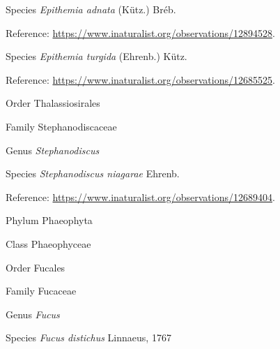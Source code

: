 \documentclass[9pt, article]{memoir}
\begin{document}
\begin{multicols}{2}
\vspace{6pt}\noindent\hspace{36pt}Species \textit{Epithemia adnata} (Kütz.) Bréb.


\vspace{6pt}Reference: 
\url{https://www.inaturalist.org/observations/12894528}.

\vspace{6pt}\noindent\hspace{36pt}Species \textit{Epithemia turgida} (Ehrenb.) Kütz.


\vspace{6pt}Reference: 
\url{https://www.inaturalist.org/observations/12685525}.

\vspace{6pt}\noindent\hspace{18pt}Order Thalassiosirales


\vspace{6pt}\noindent\hspace{24pt}Family Stephanodiscaceae


\vspace{6pt}\noindent\hspace{30pt}Genus \textit{Stephanodiscus}


\vspace{6pt}\noindent\hspace{36pt}Species \textit{Stephanodiscus niagarae} Ehrenb.


\vspace{6pt}Reference: 
\url{https://www.inaturalist.org/observations/12689404}.

\vspace{6pt}\noindent\hspace{6pt}Phylum Phaeophyta


\vspace{6pt}\noindent\hspace{12pt}Class Phaeophyceae


\vspace{6pt}\noindent\hspace{18pt}Order Fucales


\vspace{6pt}\noindent\hspace{24pt}Family Fucaceae


\vspace{6pt}\noindent\hspace{30pt}Genus \textit{Fucus}


\vspace{6pt}\noindent\hspace{36pt}Species \textit{Fucus distichus} Linnaeus, 1767



\end{multicols}
\end{document}
